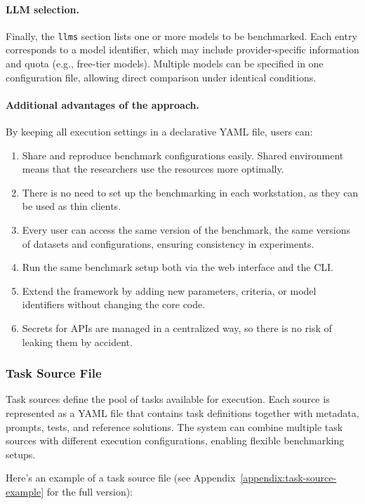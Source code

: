 \paragraph{LLM selection.}
Finally, the \texttt{llms} section lists one or more models to be benchmarked.
Each entry corresponds to a model identifier, which may include provider-specific information and quota (e.g., free-tier models).
Multiple models can be specified in one configuration file, allowing direct comparison under identical conditions.

\paragraph{Additional advantages of the approach.}
By keeping all execution settings in a declarative YAML file, users can:
\begin{enumerate}
    \item Share and reproduce benchmark configurations easily. Shared environment means that the researchers use the resources more optimally.
    \item There is no need to set up the benchmarking in each workstation, as they can be used as thin clients.
    \item Every user can access the same version of the benchmark, the same versions of datasets and configurations, ensuring consistency in experiments.
    \item Run the same benchmark setup both via the web interface and the CLI.
    \item Extend the framework by adding new parameters, criteria, or model identifiers without changing the core code.
    \item Secrets for APIs are managed in a centralized way, so there is no risk of leaking them by accident.
\end{enumerate}


\subsubsection{Task Source File}

Task sources define the pool of tasks available for execution.
Each source is represented as a YAML file that contains task definitions together with metadata, prompts, tests, and reference solutions.
The system can combine multiple task sources with different execution configurations, enabling flexible benchmarking setups.

Here's an example of a task source file (see Appendix~\ref{appendix:task-source-example} for the full version):

